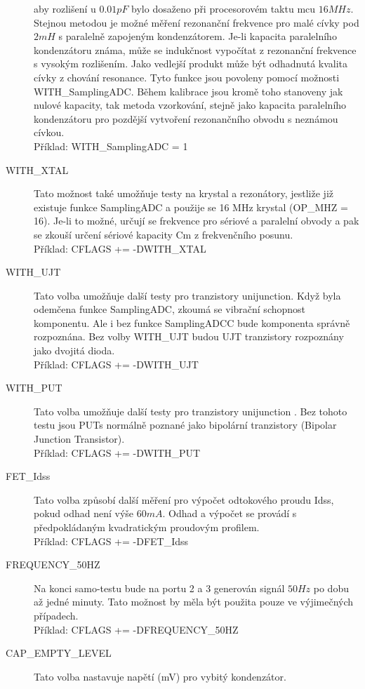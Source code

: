 \begin{description}
aby rozlišení u \(0.01pF\) bylo dosaženo při procesorovém taktu mcu \(16MHz\).
Stejnou metodou je možné měření rezonanční frekvence pro malé cívky pod \(2mH\) s paralelně
zapojeným kondenzátorem.
Je-li kapacita paralelního kondenzátoru známa, může se indukčnost vypočítat z rezonanční
frekvence s vysokým rozlišením.
Jako vedlejší produkt může být odhadnutá kvalita cívky z chování resonance.
Tyto funkce jsou povoleny pomocí možnosti WITH\_SamplingADC.
Během kalibrace jsou kromě toho stanoveny jak nulové kapacity, tak metoda vzorkování,
stejně jako kapacita paralelního kondenzátoru pro pozdější vytvoření rezonančního obvodu s neznámou cívkou.\\
Příklad: WITH\_SamplingADC = 1
  \item[WITH\_XTAL]
Tato možnost také umožňuje testy na krystal a rezonátory, jestliže již existuje funkce SamplingADC
a použije se 16 MHz krystal (OP\_MHZ = 16).
Je-li to možné, určují se frekvence pro sériové a paralelní obvody a pak se zkouší
určení sériové kapacity Cm z frekvenčního posunu.\\
Příklad: CFLAGS += -DWITH\_XTAL
  \item[WITH\_UJT]
Tato volba umožňuje další testy pro tranzistory unijunction.
Když byla odemčena funkce SamplingADC, zkoumá se vibrační schopnost komponentu.
Ale i bez funkce SamplingADCC bude komponenta správně rozpoznána.
Bez volby WITH\_UJT budou UJT tranzistory rozpoznány jako dvojitá dioda.\\
Příklad: CFLAGS += -DWITH\_UJT
  \item[WITH\_PUT]
	  Tato volba umožňuje další testy pro tranzistory unijunction .
Bez tohoto testu jsou PUTs normálně poznané jako bipolární tranzistory (Bipolar Junction Transistor).\\
Příklad: CFLAGS += -DWITH\_PUT
 \item[FET\_Idss]
Tato volba způsobí další měření pro výpočet odtokového proudu Idss, pokud odhad není
výše \(60mA\). Odhad a výpočet se provádí s předpokládaným kvadratickým proudovým profilem.\\
Příklad: CFLAGS += -DFET\_Idss
  \item[FREQUENCY\_50HZ] Na konci samo-testu bude na portu 2 a 3 generován signál \(50Hz\) po
dobu až jedné minuty.
Tato možnost by měla být použita pouze ve výjimečných případech.\\
Příklad: CFLAGS += -DFREQUENCY\_50HZ
  \item[CAP\_EMPTY\_LEVEL] Tato volba nastavuje napětí (mV) pro vybitý kondenzátor.

\end{description}
